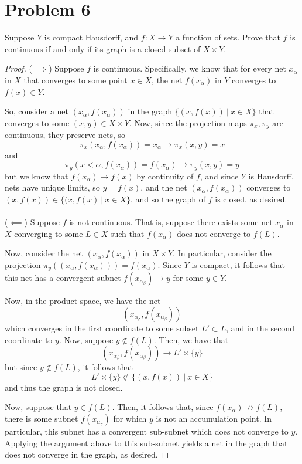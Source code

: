 \documentclass[fontsize=11pt]{scrartcl} %
\numberwithin{equation}{section} %
\numberwithin{figure}{section} %
\numberwithin{table}{section} %
\begin{document}
\section*{Problem 6}
Suppose $Y$ is compact Hausdorff, and $f:X\to Y$ a function of sets. Prove that
$f$ is continuous if and only if its graph is a closed subset of $X\times Y$.
\\
\begin{proof}
    ($\implies$)
    Suppose $f$ is continuous. Specifically, we know that for every net $x_{\alpha}$
    in $X$ that converges to some point $x\in X$, the net $f(x_{\alpha})$
    in $Y$ converges to $f(x)\in Y$.

    So, consider a net $(x_{\alpha},f(x_{\alpha}))$ in the graph $\{(x,f(x))\ |\
    x\in X\}$ that converges to some $(x,y)\in X\times Y$. Now, since the
    projection maps $\pi_x,\pi_y$ are continuous, they preserve nets, so
    \[
        \pi_x(x_{\alpha},f(x_{\alpha})) = x_{\alpha} \to \pi_x(x,y)=x
    \]
    and
    \[
        \pi_y(x<{\alpha},f(x_{\alpha})) = f(x_{\alpha}) \to \pi_y(x,y) = y
    \]
    but we know that $f(x_{\alpha})\to f(x)$ by continuity of $f$, and since $Y$
    is Hausdorff, nets have unique limits, so $y=f(x)$, and the net
    $(x_{\alpha},f(x_{\alpha}))$ converges to $(x,f(x))\in \{(x,f(x)\ |\ x\in
    X\}$, and so the graph of $f$ is closed, as desired.
    \\
    \\
    ($\impliedby$)
    Suppose $f$ is not continuous. That is, suppose there exists some net
    $x_{\alpha}$ in $X$ converging to some $L\in X$ such that
    $f(x_{\alpha})$ does not converge to $f(L)$.

    Now, consider the net $(x_{\alpha},f(x_{\alpha}))$ in $X\times Y$. In
    particular, consider the projection $\pi_y((x_{\alpha},f(x_{\alpha}))) =
    f(x_{\alpha})$. Since $Y$ is compact, it follows that this net has a
    convergent subnet $f(x_{\alpha_{\beta}})\to y$ for some $y\in Y$.

    Now, in the product space, we have the net
    \[
        (x_{\alpha_{\beta}}, f(x_{\alpha_{\beta}}))
    \]
    which converges in the first coordinate to some subset $L'\subset L$, and in
    the second coordinate to $y$. Now, suppose $y\not\in f(L)$. Then, we have
    that
    \[
        (x_{\alpha_{\beta}}, f(x_{\alpha_{\beta}}))\to L'\times \{y\}
    \]
    but since $y\not\in f(L)$, it follows that
    \[
        L'\times \{y\}\not\subset \{(x,f(x))\ |\ x\in X\}
    \]
    and thus the graph is not closed.

    Now, suppose that $y\in f(L)$. Then, it follows that, since
    $f(x_{\alpha})\not\to f(L)$, there is some subnet $f(x_{\alpha_{\gamma}})$
    for which $y$ is not an accumulation point. In particular, this subnet has a
    convergent sub-subnet which does not converge to $y$. Applying the argument
    above to this sub-subnet yields a net in the graph that does not converge in
    the graph, as desired.
\end{proof}
\end{document}
